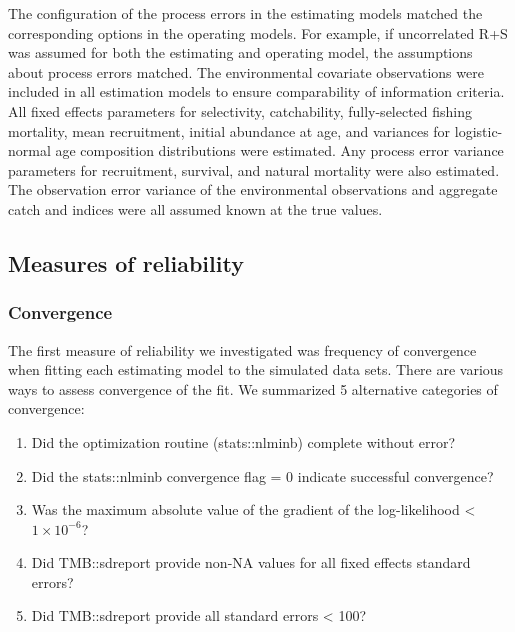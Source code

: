 \documentclass[
  12pt,
]{article}
\begin{document}
The configuration of the process errors in the estimating models matched
the corresponding options in the operating models. For example, if
uncorrelated R+S was assumed for both the estimating and operating
model, the assumptions about process errors matched. The environmental
covariate observations were included in all estimation models to ensure
comparability of information criteria. All fixed effects parameters for
selectivity, catchability, fully-selected fishing mortality, mean
recruitment, initial abundance at age, and variances for logistic-normal
age composition distributions were estimated. Any process error variance
parameters for recruitment, survival, and natural mortality were also
estimated. The observation error variance of the environmental
observations and aggregate catch and indices were all assumed known at
the true values.

\hypertarget{measures-of-reliability}{%
\subsection*{Measures of reliability}\label{measures-of-reliability}}

\hypertarget{convergence}{%
\subsubsection*{Convergence}\label{convergence}}

The first measure of reliability we investigated was frequency of
convergence when fitting each estimating model to the simulated data
sets. There are various ways to assess convergence of the fit. We
summarized 5 alternative categories of convergence:

\begin{enumerate}
\item Did the optimization routine (stats::nlminb) complete without error?
\item Did the stats::nlminb convergence flag = 0 indicate successful convergence?
\item Was the maximum absolute value of the gradient of the log-likelihood < $1\times10^{-6}$?
\item Did TMB::sdreport provide non-NA values for all fixed effects standard errors?
\item Did TMB::sdreport provide all standard errors < 100?
\end{enumerate}
\end{document}
